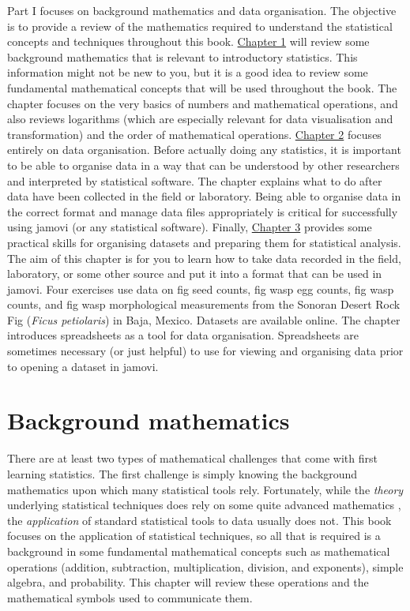 \documentclass[
]{scrbook}
\begin{document}
Part I focuses on background mathematics and data organisation.
The objective is to provide a review of the mathematics required to understand the statistical concepts and techniques throughout this book.
\protect\hyperlink{Chapter_1}{Chapter 1} will review some background mathematics that is relevant to introductory statistics.
This information might not be new to you, but it is a good idea to review some fundamental mathematical concepts that will be used throughout the book.
The chapter focuses on the very basics of numbers and mathematical operations, and also reviews logarithms (which are especially relevant for data visualisation and transformation) and the order of mathematical operations.
\protect\hyperlink{Chapter_2}{Chapter 2} focuses entirely on data organisation.
Before actually doing any statistics, it is important to be able to organise data in a way that can be understood by other researchers and interpreted by statistical software.
The chapter explains what to do after data have been collected in the field or laboratory.
Being able to organise data in the correct format and manage data files appropriately is critical for successfully using jamovi (or any statistical software).
Finally, \protect\hyperlink{Chapter_3}{Chapter 3} provides some practical skills for organising datasets and preparing them for statistical analysis.
The aim of this chapter is for you to learn how to take data recorded in the field, laboratory, or some other source and put it into a format that can be used in jamovi.
Four exercises use data on fig seed counts, fig wasp egg counts, fig wasp counts, and fig wasp morphological measurements from the Sonoran Desert Rock Fig (\emph{Ficus petiolaris}) in Baja, Mexico.
Datasets are available online.
The chapter introduces spreadsheets as a tool for data organisation.
Spreadsheets are sometimes necessary (or just helpful) to use for viewing and organising data prior to opening a dataset in jamovi.

\hypertarget{Chapter_1}{%
\chapter{Background mathematics}\label{Chapter_1}}

There are at least two types of mathematical challenges that come with first learning statistics.
The first challenge is simply knowing the background mathematics upon which many statistical tools rely.
Fortunately, while the \emph{theory} underlying statistical techniques does rely on some quite advanced mathematics \citep[e.g., see][]{Mclean1991, Rencher2000, Miller2004}, the \emph{application} of standard statistical tools to data usually does not.
This book focuses on the application of statistical techniques, so all that is required is a background in some fundamental mathematical concepts such as mathematical operations (addition, subtraction, multiplication, division, and exponents), simple algebra, and probability.
This chapter will review these operations and the mathematical symbols used to communicate them.
\end{document}
